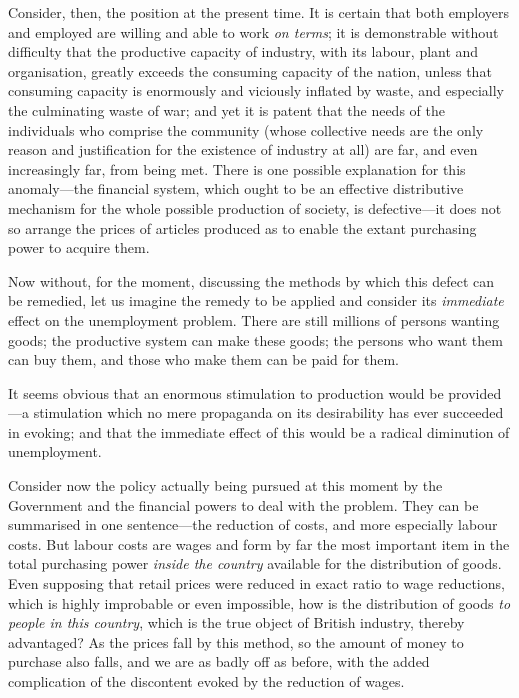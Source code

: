 \documentclass{book}
\begin{document}
Consider, then, the position at the present time. It is certain that both employers and employed are willing and able to work \emph{on terms}; it is demonstrable without difficulty that the productive capacity of industry, with its labour, plant and organisation, greatly exceeds the consuming capacity of the nation, unless that consuming capacity is enormously and viciously inflated by waste, and especially the culminating waste of war; and yet it is patent that the needs of the individuals who comprise the community (whose collective needs are the only reason and justification for the existence of industry at all) are far, and even increasingly far, from being met. There is one possible explanation for this anomaly—the financial system, which ought to be an effective distributive mechanism for the whole possible production of society, is defective—it does not so arrange the prices of articles produced as to enable the extant purchasing power to acquire them.

Now without, for the moment, discussing the methods by which this defect can be remedied, let us imagine the remedy to be applied and consider its \emph{immediate} effect on the unemployment problem. There are still millions of persons wanting goods; the productive system can make these goods; the persons who want them can buy them, and those who make them can be paid for them.

It seems obvious that an enormous stimulation to production would be provided—a stimulation which no mere propaganda on its desirability has ever succeeded in evoking; and that the immediate effect of this would be a radical diminution of unemployment.

Consider now the policy actually being pursued at this moment by the Government and the financial powers to deal with the problem. They can be summarised in one sentence—the reduction of costs, and more especially labour costs. But labour costs are wages and form by far the most important item in the total purchasing power \emph{inside the country} available for the distribution of goods. Even supposing that retail prices were reduced in exact ratio to wage reductions, which is highly improbable or even impossible, how is the distribution of goods \emph{to people in this country}, which is the true object of British industry, thereby advantaged? As the prices fall by this method, so the amount of money to purchase also falls, and we are as badly off as before, with the added complication of the discontent evoked by the reduction of wages.
\end{document}
